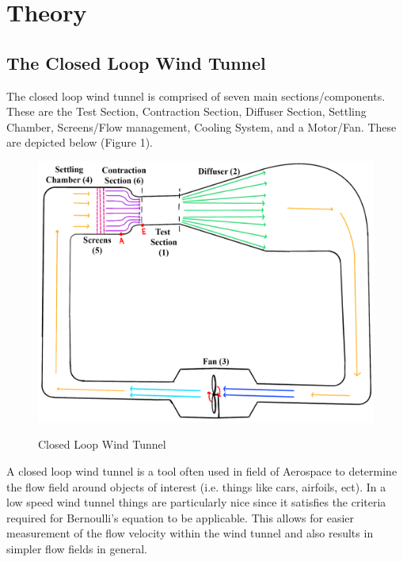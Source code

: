 \documentclass[12pt]{article}
\begin{document}
\section{Theory}
\subsection{The Closed Loop Wind Tunnel}
The closed loop wind tunnel is comprised of seven main sections/components. These are the Test Section, Contraction Section, Diffuser Section, Settling Chamber, Screens/Flow management, Cooling System, and a Motor/Fan. These are depicted below (Figure 1). 

    \begin{figure}[h]
        \includegraphics[width=16 cm]{Figure1.png}
        \centering
        \label{Figure 1}
        \caption{Closed Loop Wind Tunnel}
    \end{figure}
A closed loop wind tunnel is a tool often used in field of Aerospace to determine the flow field around objects of interest (i.e. things like cars, airfoils, ect). In a low speed wind tunnel things are particularly nice since it satisfies the criteria required for Bernoulli's equation to be applicable. This allows for easier measurement of the flow velocity within the wind tunnel and also results in simpler flow fields in general.
\end{document}
